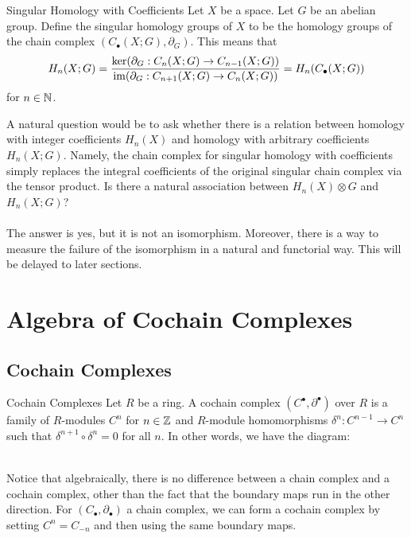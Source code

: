 \documentclass[a4paper]{article}
\begin{document}
\begin{defn}{Singular Homology with Coefficients}{} Let $X$ be a space. Let $G$ be an abelian group. Define the singular homology groups of $X$ to be the homology groups of the chain complex $(C_\bullet(X;G),\partial_G)$. This means that $$H_n(X;G)=\frac{\ker(\partial_G:C_n(X;G)\to C_{n-1}(X;G))}{\operatorname{im}(\partial_G:C_{n+1}(X;G)\to C_n(X;G))}=H_n(C_\bullet(X;G))$$ for $n\in\mathbb{N}$. 
\end{defn}

A natural question would be to ask whether there is a relation between homology with integer coefficients $H_n(X)$ and homology with arbitrary coefficients $H_n(X;G)$. Namely, the chain complex for singular homology with coefficients simply replaces the integral coefficients of the original singular chain complex via the tensor product. Is there a natural association between $H_n(X)\otimes G$ and $H_n(X;G)$? \\~\\

The answer is yes, but it is not an isomorphism. Moreover, there is a way to measure the failure of the isomorphism in a natural and functorial way. This will be delayed to later sections. 

\pagebreak
\section{Algebra of Cochain Complexes}
\subsection{Cochain Complexes}
\begin{defn}{Cochain Complexes}{} Let $R$ be a ring. A cochain complex $(C^\bullet,\partial^\bullet)$ over $R$ is a family of $R$-modules $C^n$ for $n\in\mathbb{Z}$ and $R$-module homomorphisms $\delta^n:C^{n-1}\to C^n$ such that $\delta^{n+1}\circ\delta^n=0$ for all $n$. In other words, we have the diagram: \\~\\
\end{defn}

Notice that algebraically, there is no difference between a chain complex and a cochain complex, other than the fact that the boundary maps run in the other direction. For $(C_\bullet,\partial_\bullet)$ a chain complex, we can form a cochain complex by setting $C^n=C_{-n}$ and then using the same boundary maps. 
\end{document}
